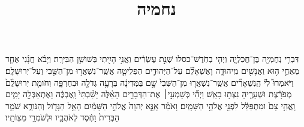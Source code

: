 \documentclass{openreader}
\title{נחמיה}
\date{}
\begin{document}
\maketitle
\raggedbottom 
\fontsize{16pt}{24pt}\selectfont


דִּבְרֵ֥י נְחֶמְיָ֖ה בֶּן־חֲכַלְיָ֑ה וַיְהִ֤י בְחֹֽדֶשׁ־כסלו שְׁנַ֣ת עֶשְׂרִ֔ים וַאֲנִ֥י הָיִ֖יתִי בְּשׁוּשַׁ֥ן הַבִּירָֽה׃ 
וַיָּבֹ֨א חֲנָ֜נִי אֶחָ֧ד מֵאַחַ֛י ה֥וּא וַאֲנָשִׁ֖ים מִֽיהוּדָ֑ה וָאֶשְׁאָלֵ֞ם עַל־הַיְּהוּדִ֧ים הַפְּלֵיטָ֛ה אֲשֶֽׁר־נִשְׁאֲר֥וּ מִן־הַשֶּׁ֖בִי וְעַל־יְרוּשָׁלִָֽם׃ 
וַיֹּאמְרוּ֮ לִי֒ הַֽנִּשְׁאָרִ֞ים אֲשֶֽׁר־נִשְׁאֲר֤וּ מִן־הַשְּׁבִי֙ שָׁ֣ם בַּמְּדִינָ֔ה בְּרָעָ֥ה גְדֹלָ֖ה וּבְחֶרְפָּ֑ה וְחֹומַ֤ת יְרוּשָׁלִַ֨ם֙ מְפֹרָ֔צֶת וּשְׁעָרֶ֖יהָ נִצְּת֥וּ בָאֵֽשׁ׃ 
וַיְהִ֞י כְּשָׁמְעִ֣י׀ אֶת־הַדְּבָרִ֣ים הָאֵ֗לֶּה יָשַׁ֨בְתִּי֙ וָֽאֶבְכֶּ֔ה וָאֶתְאַבְּלָ֖ה יָמִ֑ים וָֽאֱהִ֥י צָם֙ וּמִתְפַּלֵּ֔ל לִפְנֵ֖י אֱלֹהֵ֥י הַשָּׁמָֽיִם׃ 
וָאֹמַ֗ר אָֽנָּ֤א יְהוָה֙ אֱלֹהֵ֣י הַשָּׁמַ֔יִם הָאֵ֥ל הַגָּדֹ֖ול וְהַנֹּורָ֑א שֹׁמֵ֤ר הַבְּרִית֙ וָחֶ֔סֶד לְאֹהֲבָ֖יו וּלְשֹׁמְרֵ֥י מִצְוֹתָֽיו׃ 
\end{document}
